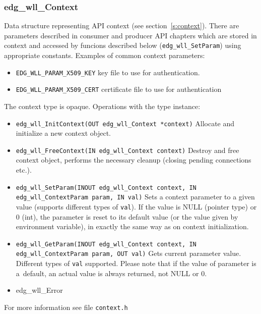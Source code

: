 \subsubsection{edg\_wll\_Context} 
Data structure representing \LB API context (see
section~\ref{s:context}).  There are parameters described in consumer
and producer API chapters which are stored in context and accessed by
funcions described below (\texttt{edg\_wll\_SetParam}) using
appropriate constants. Examples of common context parameters:
\begin{itemize}
  \item \texttt{EDG\_WLL\_PARAM\_X509\_KEY} key file to use for authentication.
  \item \texttt{EDG\_WLL\_PARAM\_X509\_CERT} certificate file to use for
      authentication
\end{itemize}


The context type is opaque. Operations with the type instance:
\begin{itemize}
  \item \texttt{edg\_wll\_InitContext(OUT edg\_wll\_Context *context)}
    Allocate and initialize a new context object.
  \item \texttt{edg\_wll\_FreeContext(IN edg\_wll\_Context context)}
    Destroy and free context object, performs the necessary cleanup
    (closing pending connections etc.).
  \item \texttt{edg\_wll\_SetParam(INOUT edg\_wll\_Context context, IN
    edg\_wll\_ContextParam param, IN val)} Sets a context parameter to
    a given value (supports different types of \texttt{val}). If the
    value is NULL (pointer type) or 0 (int), the parameter is reset to
    its default value (or the value given by environment variable), in
    exactly the same way as on context initialization.
  \item \texttt{edg\_wll\_GetParam(INOUT edg\_wll\_Context context, IN
    edg\_wll\_ContextParam param, OUT val)} Gets current parameter
    value. Different types of \texttt{val} supported. Please note that
    if the value of parameter is a~default, an actual value is always
    returned, not NULL or 0.
  \item edg\_wll\_Error 
\end{itemize}
For more information see file \texttt{context.h} 


